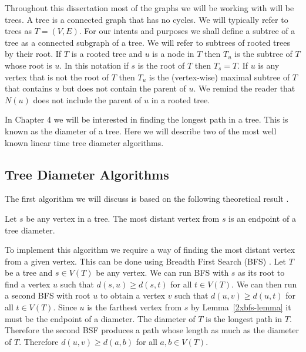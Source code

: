 Throughout this dissertation most of the graphs we will be working with will be trees. A tree is a connected graph that has no cycles. We will typically refer to trees as $T = (V, E)$. For our intents and purposes we shall define a subtree of a tree as a connected subgraph of a tree. We will refer to subtrees of rooted trees by their root. If $T$ is a rooted tree and $u$ is a node in $T$ then $T_u$ is the subtree of $T$ whose root is $u$. In this notation if $s$ is the root of $T$ then $T_s = T$. If $u$ is any vertex that is not the root of $T$ then $T_u$ is the (vertex-wise) maximal subtree of $T$ that contains $u$ but does not contain the parent of $u$. We remind the reader that $N(u)$ does not include the parent of $u$ in a rooted tree.


In Chapter 4 we will be interested in finding the longest path in a tree. This is known as the diameter of a tree. Here we will  describe two of the most well known linear time tree diameter algorithms.

\subsection{Tree Diameter Algorithms}

The first algorithm we will discuss is based on the following theoretical result \cite{2bfs-poof}.

\begin{lem} \label{2xbfs-lemma} Let $s$ be any vertex in a tree. The most distant vertex from $s$ is an endpoint of a tree diameter. \end{lem}

To implement this algorithm we require a way of finding the most distant vertex from a given vertex. This can be done using Breadth First Search (BFS) \cite[p. 594]{intro-to-algo}. Let $T$ be a tree and $s \in V(T)$ be any vertex. We can run BFS with $s$ as its root to find a vertex $u$ such that $d(s, u) \ge d(s, t)$ for all $t \in V(T)$. We can then run a second BFS with root $u$ to obtain a vertex $v$ such that $d(u, v) \ge d(u, t)$ for all $t \in V(T)$. Since $u$ is the farthest vertex from $s$ by Lemma~\ref{2xbfs-lemma} it must be the endpoint of a diameter. The diameter of $T$ is the longest path in $T$. Therefore the second BSF produces a path whose length as much as the diameter of $T$. Therefore $d(u, v) \ge d(a, b)$ for all $a,b \in V(T)$.

